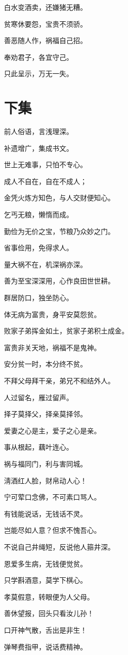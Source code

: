 \documentclass[12pt,oneside]{book}
\begin{document}
白水变酒卖，还嫌猪无糟。

贫寒休要怨，宝贵不须骄。

善恶随人作，祸福自己招。

奉劝君子，各宜守己。

只此呈示，万无一失。

\section{下集}
前人俗语，言浅理深。

补遗增广，集成书文。

世上无难事，只怕不专心。

成人不自在，自在不成人；

金凭火炼方知色，与人交财便知心。

乞丐无粮，懒惰而成。

勤俭为无价之宝，节粮乃众妙之门。

省事俭用，免得求人。

量大祸不在，机深祸亦深。

善为至宝深深用，心作良田世世耕。

群居防口，独坐防心。

体无病为富贵，身平安莫怨贫。

败家子弟挥金如土，贫家子弟积土成金。

富贵非关天地，祸福不是鬼神。

安分贫一时，本分终不贫。

不拜父母拜干亲，弟兄不和结外人。

人过留名，雁过留声。

择子莫择父，择亲莫择邻。

爱妻之心是主，爱子之心是亲。

事从根起，藕叶连心。

祸与福同门，利与害同城。

淸酒红人脸，财帛动人心！

宁可荤口念佛，不可素口骂人。

有钱能说话，无钱话不灵。

岂能尽如人意？但求不愧吾心。

不说自己井绳短，反说他人箍井深。

恩爱多生病，无钱便觉贫。

只学斟酒意，莫学下棋心。

孝莫假意，转眼便为人父母。

善休望报，回头只看汝儿孙！

口开神气散，舌出是非生！

弹琴费指甲，说话费精神。
\end{document}
